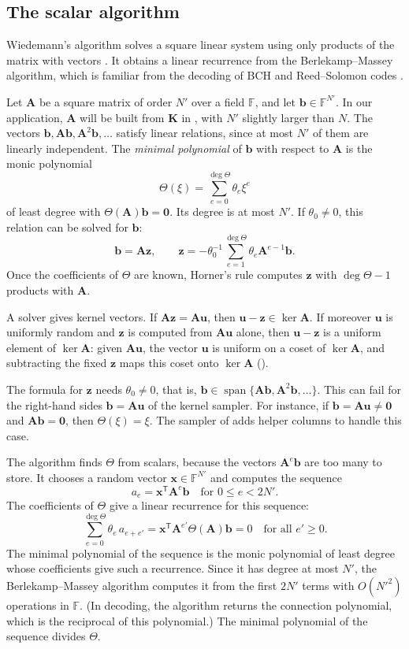 \documentclass[b5paper, 10pt, abstract=true, captions=tableheading]{scrartcl}
\theoremstyle{plain}
\theoremstyle{definition}
\newcommand{\FF}{\mathds{F}}
\newcommand{\tr}{\mathsf{T}}
\renewcommand{\vec}[1]{\symbf{#1}}
\newcommand{\mat}[1]{\symbf{#1}}
\newcommand{\Span}{\operatorname{span}}
\begin{document}
\subsection{The scalar algorithm}
\label{subsec:wiedemann-scalar}
Wiedemann's algorithm solves a square linear system using only products of
the matrix with vectors \cite{Wiedemann1986}. It obtains a linear recurrence
from the Berlekamp--Massey algorithm, which is familiar from the decoding of
BCH and Reed--Solomon codes \cite{Massey1969}.

Let $\mat A$ be a square matrix of order $N'$ over a field $\FF$, and let
$\vec b\in\FF^{N'}$. In our application, $\mat A$ will be built from
$\mat K$ in , with $N'$ slightly larger than
$N$. The vectors
$\vec b,\mat A\vec b,\mat A^2\vec b,\ldots$ satisfy linear relations, since
at most $N'$ of them are linearly independent. The \emph{minimal
polynomial} of $\vec b$ with respect to $\mat A$ is the monic polynomial
\[
  \Theta(\xi)=\sum_{e=0}^{\deg\Theta}\theta_e\xi^e
\]
of least degree with $\Theta(\mat A)\vec b=\vec0$. Its degree is at most
$N'$. If $\theta_0\neq0$, this relation can be solved for $\vec b$:
\[
  \vec b=\mat A\vec z,
  \qquad
  \vec z=-\theta_0^{-1}\sum_{e=1}^{\deg\Theta}\theta_e\mat A^{e-1}\vec b.
\]
Once the coefficients of $\Theta$ are known, Horner's rule computes $\vec z$
with $\deg\Theta-1$ products with $\mat A$.

A solver gives kernel vectors. If $\mat A\vec z=\mat A\vec u$, then
$\vec u-\vec z\in\ker\mat A$. If moreover $\vec u$ is uniformly random and
$\vec z$ is computed from $\mat A\vec u$ alone, then $\vec u-\vec z$ is a
uniform element of $\ker\mat A$: given $\mat A\vec u$, the vector $\vec u$ is uniform on a
coset of $\ker\mat A$, and subtracting the fixed $\vec z$ maps this coset
onto $\ker\mat A$ ().

The formula for $\vec z$ needs $\theta_0\neq0$, that is,
$\vec b\in\Span\{\mat A\vec b,\mat A^2\vec b,\ldots\}$. This can fail for
the right-hand sides $\vec b=\mat A\vec u$ of the kernel sampler. For
instance, if $\vec b=\mat A\vec u\neq\vec0$ and $\mat A\vec b=\vec0$, then
$\Theta(\xi)=\xi$. The sampler of  adds
helper columns to handle this case.

The algorithm finds $\Theta$ from scalars, because the vectors
$\mat A^e\vec b$ are too many to store. It chooses a random vector
$\vec x\in\FF^{N'}$ and computes the sequence
\[
  a_e=\vec x^\tr\mat A^e\vec b
  \quad\text{for }0\leq e<2N'.
\]
The coefficients of $\Theta$ give a linear recurrence for this sequence:
\[
  \sum_{e=0}^{\deg\Theta}\theta_e\,a_{e+e'}
  =\vec x^\tr\mat A^{e'}\Theta(\mat A)\vec b=0
  \quad\text{for all }e'\geq0.
\]
The minimal polynomial of the sequence is the monic polynomial of least
degree whose coefficients give such a recurrence. Since it has degree at
most $N'$, the Berlekamp--Massey algorithm computes it from the first $2N'$
terms with $O(N'^2)$ operations in $\FF$. (In decoding, the algorithm
returns the connection polynomial, which is the reciprocal of this
polynomial.) The minimal polynomial of the sequence divides $\Theta$.
\end{document}
